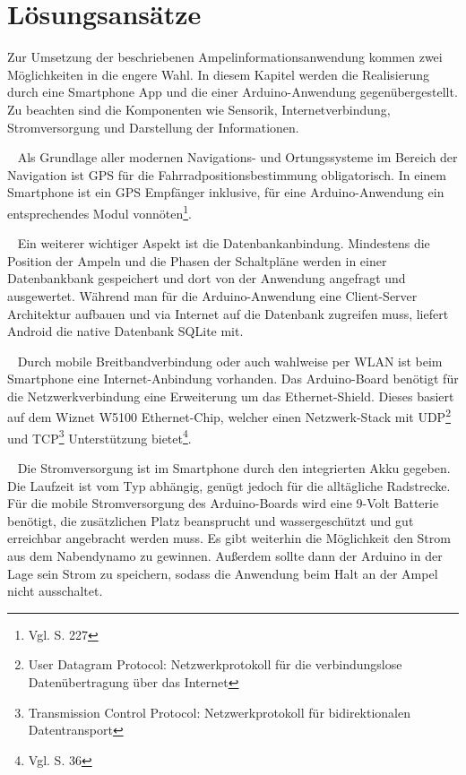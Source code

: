 \chapter{\label{chap:entscheidung}Lösungsansätze}
Zur Umsetzung der beschriebenen Ampelinformationsanwendung kommen zwei Möglichkeiten in die engere Wahl. In diesem Kapitel werden die Realisierung durch eine \gls{Smartphone} \Gls{App} und die einer \gls{Arduino}-Anwendung gegenübergestellt. Zu beachten sind die Komponenten wie Sensorik, Internetverbindung, Stromversorgung und Darstellung der Informationen.\\
\begin{description}[leftmargin=0.7cm,style=nextline]
  \item[\gls{GPS}] ~ Als Grundlage aller modernen Navigations- und Ortungssysteme im Bereich der Navigation ist \gls{GPS} für die Fahrradpositionsbestimmung obligatorisch. In einem \gls{Smartphone} ist ein \gls{GPS} Empfänger inklusive, für eine \gls{Arduino}-Anwendung ein entsprechendes Modul vonnöten\footnote{ Vgl. \cite{arduino} S. 227}.\\
 \item[Datenbankanbindung] ~ Ein weiterer wichtiger Aspekt ist die Datenbankanbindung. Mindestens die Position der Ampeln und die Phasen der Schaltpläne werden in einer Datenbankbank gespeichert und dort von der Anwendung angefragt und ausgewertet. Während man für die \gls{Arduino}-Anwendung eine Client-Server Architektur aufbauen und via Internet auf die Datenbank zugreifen muss, liefert Android die native Datenbank SQLite mit.\\
  \item[Internetverbindung] ~ Durch mobile Breitbandverbindung oder auch wahlweise per \gls{WLAN} ist beim \gls{Smartphone} eine Internet-Anbindung vorhanden. Das \gls{Arduino}-Board benötigt für die Netzwerkverbindung eine Erweiterung um das Ethernet-Shield. Dieses basiert auf dem Wiznet W5100 Ethernet-Chip, welcher einen Netzwerk-Stack mit UDP\footnote{ User Datagram Protocol: Netzwerkprotokoll für die verbindungslose Datenübertragung über das Internet } und TCP\footnote{ Transmission Control Protocol: Netzwerkprotokoll für bidirektionalen Datentransport} Unterstützung bietet\footnote{ Vgl. \cite{arduino} S. 36}.\\
  \item[Stromversorgung] ~ Die Stromversorgung ist im \gls{Smartphone} durch den integrierten Akku gegeben. Die Laufzeit ist vom Typ abhängig, genügt jedoch für die alltägliche Radstrecke. Für die mobile Stromversorgung des \gls{Arduino}-Boards wird eine 9-Volt Batterie benötigt, die zusätzlichen Platz beansprucht und wassergeschützt und gut erreichbar angebracht werden muss. Es gibt weiterhin die Möglichkeit den Strom aus dem Nabendynamo zu gewinnen. Außerdem sollte dann der \gls{Arduino} in der Lage sein Strom zu speichern, sodass die Anwendung beim Halt an der Ampel nicht ausschaltet.\\

\end{description}
